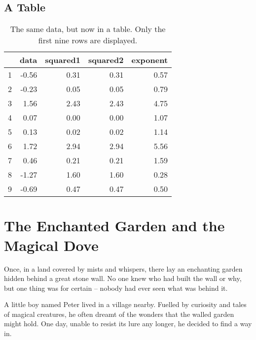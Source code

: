 \documentclass[10pt, a4paper, titlepage]{article}
\begin{document}
\subsection{A Table}

\begin{table}[H]
\centering
\caption{The same data, but now in a table. Only the first nine rows are displayed.}
\begin{tabular}{rrrrr}
\toprule
 & \textbf{data} & \textbf{squared1} & \textbf{squared2} & \textbf{exponent} \\
 \midrule
1 & -0.56        & 0.31              & 0.31              & 0.57              \\
2 & -0.23        & 0.05              & 0.05              & 0.79              \\
3 & 1.56         & 2.43              & 2.43              & 4.75              \\
4 & 0.07         & 0.00              & 0.00              & 1.07              \\
5 & 0.13         & 0.02              & 0.02              & 1.14              \\
6 & 1.72         & 2.94              & 2.94              & 5.56              \\
7 & 0.46         & 0.21              & 0.21              & 1.59              \\
8 & -1.27        & 1.60              & 1.60              & 0.28              \\
9 & -0.69        & 0.47              & 0.47              & 0.50              \\
\bottomrule
\end{tabular}
\end{table}

\section{The Enchanted Garden and the Magical Dove}

Once, in a land covered by mists and whispers, there lay an enchanting garden hidden behind a great stone wall. No one knew who had built the wall or why, but one thing was for certain – nobody had ever seen what was behind it.

A little boy named Peter lived in a village nearby. Fuelled by curiosity and tales of magical creatures, he often dreamt of the wonders that the walled garden might hold. One day, unable to resist its lure any longer, he decided to find a way in.
\end{document}
